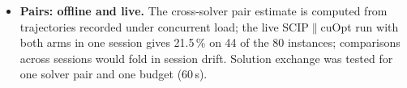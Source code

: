\begin{itemize}
(root LP statistics, early incumbents) is where a text-encoder policy could differ most from LightGBM and was not
tested. Fine-tuning hyper-parameters were set once and not tuned, and each fold was fine-tuned with a single seed.
No superiority of fine-tuned Laya over LightGBM was established on the families seen in training (paired $p=0.67$ at
10\,s); on a family left out of training Laya was better at 30\,s.
\item \textbf{Pairs: offline and live.} The cross-solver pair estimate is computed from trajectories recorded under
concurrent load; the live SCIP$\|$cuOpt run with both arms in one session gives 21.5\,\% on 44 of the 80 instances; comparisons across sessions would fold in session drift. Solution exchange
was tested for one solver pair and one budget (60\,s).
\end{itemize}

